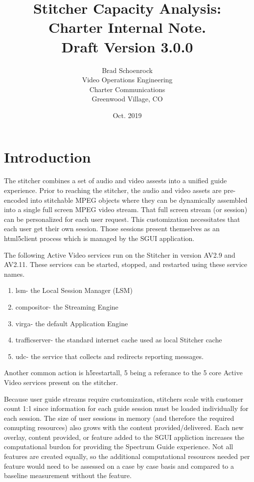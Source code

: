 \documentclass{article}
\author{Brad Schoenrock\\Video Operations Engineering\\Charter Communications\\Greenwood Village, CO}
\title{Stitcher Capacity Analysis:\\Charter Internal Note.\\Draft Version 3.0.0}
\date{Oct. 2019}
\begin{document}
\maketitle
\newpage

\tableofcontents
\newpage

\section{Introduction}
\label{SECTION-Introduction}

The stitcher combines a set of audio and video assests into a unified guide experience. Prior to reaching the stitcher, the audio and video assets are pre-encoded into stitchable MPEG objects where they can be dynamically assembled into a single full screen MPEG video stream. That full screen stream (or session) can be personalized for each user request. This customization necessitates that each user get their own session. Those sessions present themselves as an html5client process which is managed by the SGUI application. 

The following Active Video services run on the Stitcher in version AV2.9 and AV2.11. These services can be started, stopped, and restarted using these service names. 

\begin{enumerate}
\item lsm- the Local Session Manager (LSM)
\item compositor- the Streaming Engine
\item virga- the default Application Engine
\item trafficserver- the standard internet cache used as local Stitcher cache
\item udc- the service that collects and redirects reporting messages.
\end{enumerate}

Another common action is h5restartall, 5 being a referance to the 5 core Active Video services present on the stitcher.

Because user guide streams require customization, stitchers scale with customer count 1:1 since information for each guide session must be loaded individually for each session. The size of user sessions in memory (and therefore the required comupting resources) also grows with the content provided/delivered. Each new overlay, content provided, or feature added to the SGUI appliction increases the computational burdon for providing the Spectrum Guide experience. Not all features are created equally, so the additional computational resources needed per feature would need to be assessed on a case by case basis and compared to a baseline measurement without the feature. 
\end{document}

